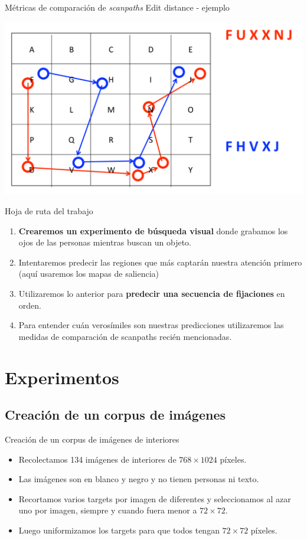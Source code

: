 \documentclass[compress]{beamer}
\begin{document}
\begin{frame}{Métricas de comparación de \textit{scanpaths}}
{Edit distance - ejemplo}

\begin{center}
    \includegraphics[width=\linewidth]{images/edit-distance.png} 
\end{center}

\end{frame}


\begin{frame}{Hoja de ruta del trabajo}
\begin{enumerate}
\item \textbf{Crearemos un experimento de búsqueda visual} donde grabamos los ojos de las personas mientras buscan un objeto.
\item Intentaremos predecir las regiones que más captarán nuestra atención primero (aquí usaremos los mapas de saliencia) 
\item Utilizaremos lo anterior para \textbf{predecir una secuencia de fijaciones} en orden.
\item Para entender cuán verosímiles son nuestras predicciones utilizaremos las medidas de comparación de scanpaths recién mencionadas.
\end{enumerate}
\end{frame}

\section{Experimentos}
\subsection{Creación de un corpus de imágenes}
\begin{frame}{Creación de un corpus de imágenes de interiores}
\begin{itemize}
\item Recolectamos 134 imágenes de interiores de $768 \times 1024$ píxeles.
\item Las imágenes son en blanco y negro y no tienen personas ni texto.
\item Recortamos varios targets por imagen de diferentes y seleccionamos al azar uno por imagen, siempre y cuando fuera menor a $72 \times 72$.
\item Luego uniformizamos los targets para que todos tengan $72 \times 72$ píxeles.
\end{itemize}
\end{frame}
\end{document}
